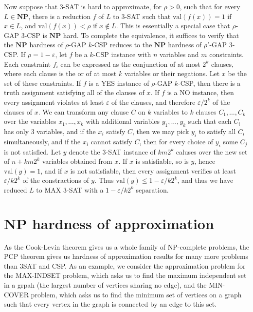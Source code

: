 Now suppose that 3-SAT is hard to approximate, for $\rho > 0$, such that for every $L \in \mathbf{NP}$, there is a reduction $f$ of $L$ to 3-SAT such that $\text{val}(f(x)) = 1$ if $x \in L$, and $\text{val}(f(x)) < \rho$ if $x \not \in L$. This is essentially a special case that $\rho$-GAP $3$-CSP is $\mathbf{NP}$ hard. To complete the equivalence, it suffices to verify that the $\mathbf{NP}$ hardness of $\rho$-GAP $k$-CSP reduces to the $\mathbf{NP}$ hardness of $\rho'$-GAP $3$-CSP. If $\rho = 1 - \varepsilon$, let $f$ be a $k$-CSP instance with $n$ variables and $m$ constraints. Each constraint $f_i$ can be expressed as the conjunction of at most $2^k$ clauses, where each clause is the or of at most $k$ variables or their negations. Let $x$ be the set of these constraints. If $f$ is a YES instance of $\rho$-GAP $k$-CSP, then there is a truth assignment satisfying all of the clauses of $x$. If $f$ is a NO instance, then every assignment violates at least $\varepsilon$ of the clauses, and therefore $\varepsilon/2^k$ of the clauses of $x$. We can transform any clause $C$ on $k$ variables to $k$ clauses $C_1, \dots, C_k$ over the variables $x_1, \dots, x_k$ with additional variables $y_1, \dots, y_k$ such that each $C_i$ has only 3 variables, and if the $x_i$ satisfy $C$, then we may pick $y_i$ to satisfy all $C_i$ simultaneously, and if the $x_i$ cannot satisfy $C$, then for every choice of $y_i$ some $C_j$ is not satisfied. Let $y$ denote the 3-SAT instance of $km2^k$ caluses over the new set of $n + km2^k$ variables obtained from $x$. If $x$ is satisfiable, so is $y$, hence $\text{val}(y) = 1$, and if $x$ is not satisfiable, then every assignment verifies at least $\varepsilon/k2^k$ of the constractions of $y$. Thus $\text{val}(y) \leq 1 - \varepsilon/k2^k$, and thus we have reduced $L$ to MAX 3-SAT with a $1-\varepsilon/k2^k$ separation.

\section{$\mathbf{NP}$ hardness of approximation}

As the Cook-Levin theorem gives us a whole family of NP-complete problems, the PCP theorem gives us hardness of approximation results for many more problems than 3SAT and CSP. As an example, we consider the approximation problem for the MAX-INDSET problem, which asks us to find the maximum independent set in a grpah (the largest number of vertices sharing no edge), and the MIN-COVER problem, which asks us to find the minimum set of vertices on a graph such that every vertex in the graph is connected by an edge to this set.

